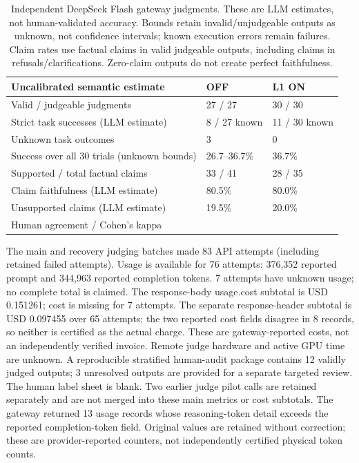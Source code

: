 \begin{table}[H]\centering\footnotesize
\begin{tabularx}{\textwidth}{@{}L{6.0cm}XX@{}}\toprule Uncalibrated semantic estimate & OFF & L1 ON\\\midrule
Valid / judgeable judgments & 27 / 27 & 30 / 30\\
Strict task successes (LLM estimate) & 8 / 27 known & 11 / 30 known\\
Unknown task outcomes & 3 & 0\\
Success over all 30 trials (unknown bounds) & 26.7--36.7\% & 36.7\%\\
Supported / total factual claims & 33 / 41 & 28 / 35\\
Claim faithfulness (LLM estimate) & 80.5\% & 80.0\%\\
Unsupported claims (LLM estimate) & 19.5\% & 20.0\%\\
Human agreement / Cohen's kappa &  & \\
\bottomrule\end{tabularx}
\caption{Independent DeepSeek Flash gateway judgments. These are LLM estimates, not human-validated accuracy. Bounds retain invalid/unjudgeable outputs as unknown, not confidence intervals; known execution errors remain failures. Claim rates use factual claims in valid judgeable outputs, including claims in refusals/clarifications. Zero-claim outputs do not create perfect faithfulness.}
\end{table}
The main and recovery judging batches made 83 API attempts (including retained failed attempts). Usage is available for 76 attempts: 376,352 reported prompt and 344,963 reported completion tokens. 7 attempts have unknown usage; no complete total is claimed. The response-body usage.cost subtotal is USD 0.151261; cost is missing for 7 attempts. The separate response-header subtotal is USD 0.097455 over 65 attempts; the two reported cost fields disagree in 8 records, so neither is certified as the actual charge. These are gateway-reported costs, not an independently verified invoice. Remote judge hardware and active GPU time are unknown. A reproducible stratified human-audit package contains 12 validly judged outputs; 3 unresolved outputs are provided for a separate targeted review. The human label sheet is blank. 
Two earlier judge pilot calls are retained separately and are not merged into these main metrics or cost subtotals.
The gateway returned 13 usage records whose reasoning-token detail exceeds the reported completion-token field. Original values are retained without correction; these are provider-reported counters, not independently certified physical token counts.
